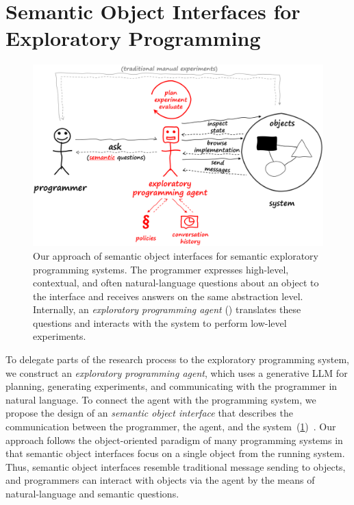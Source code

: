 
\section{Semantic Object Interfaces for Exploratory Programming}
\label{sec:design/agent}

\begin{figure}
	\centering
	\includegraphics[width=.9\textwidth]{03_agent/framework.png}
	\caption[Our approach of \emph{semantic object interfaces} for semantic exploratory programming systems.]{
		Our approach of semantic object interfaces for semantic exploratory programming systems.
		The programmer expresses high-level, contextual, and often natural-language questions about an object to the interface and receives answers on the same abstraction level.
		Internally, an \emph{exploratory programming agent} (\bold{\textcolor{red}{red}}) translates these questions and interacts with the system to perform low-level experiments.
	}
	\label{fig:design/agent/framework}
\end{figure}

To delegate parts of the research process to the exploratory programming system, we construct an \emph{exploratory programming agent}, which uses a generative LLM for planning, generating experiments, and communicating with the programmer in natural language.
To connect the agent with the programming system, we propose the design of an \emph{semantic object interface} that describes the communication between the programmer, the agent, and the system~(\cref{fig:design/agent/framework})~\cite{thiede2024talking}.
Our approach follows the object-oriented paradigm of many programming systems in that semantic object interfaces focus on a single object from the running system.
Thus, semantic object interfaces resemble traditional message sending to objects, and programmers can interact with objects via the agent by the means of natural-language and semantic questions.

